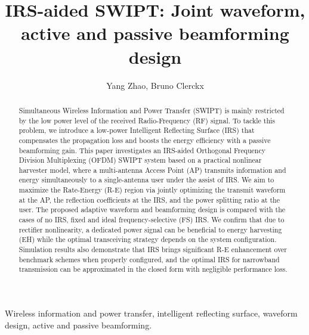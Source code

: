 \documentclass[journal]{IEEEtran}
\begin{document}
\title{IRS-aided SWIPT: Joint waveform, active and passive beamforming design}
\author{Yang Zhao, Bruno Clerckx}

\maketitle

\begin{abstract}
	Simultaneous Wireless Information and Power Transfer (SWIPT) is mainly restricted by the low power level of the received Radio-Frequency (RF) signal. To tackle this problem, we introduce a low-power Intelligent Reflecting Surface (IRS) that compensates the propagation loss and boosts the energy efficiency with a passive beamforming gain. This paper investigates an IRS-aided Orthogonal Frequency Division Multiplexing (OFDM) SWIPT system based on a practical nonlinear harvester model, where a multi-antenna Access Point (AP) transmits information and energy simultaneously to a single-antenna user under the assist of IRS. We aim to maximize the Rate-Energy (R-E) region via jointly optimizing the transmit waveform at the AP, the reflection coefficients at the IRS, and the power splitting ratio at the user. The proposed adaptive waveform and beamforming design is compared with the cases of no IRS, fixed and ideal frequency-selective (FS) IRS. We confirm that due to rectifier nonlinearity, a dedicated power signal can be beneficial to energy harvesting (EH) while the optimal transceiving strategy depends on the system configuration. Simulation results also demonstrate that IRS brings significant R-E enhancement over benchmark schemes when properly configured, and the optimal IRS for narrowband transmission can be approximated in the closed form with negligible performance loss.
\end{abstract}

\begin{IEEEkeywords}
	Wireless information and power transfer, intelligent reflecting surface, waveform design, active and passive beamforming.
\end{IEEEkeywords}
\end{document}
